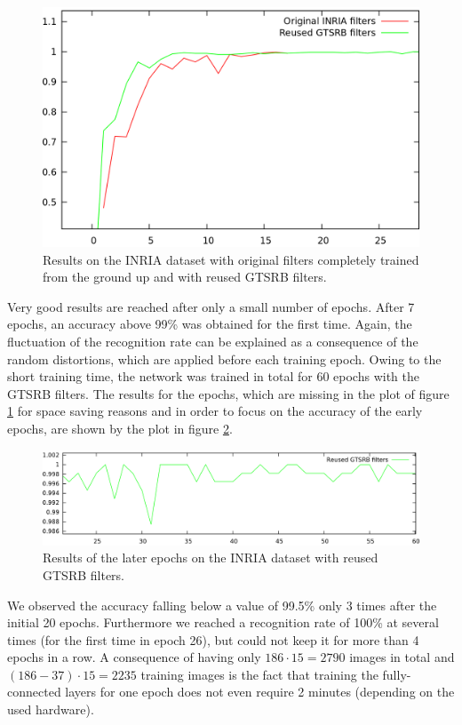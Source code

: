 \documentclass[11pt, a4paper]{article}
\begin{document}
\begin{figure}[h!]
	\centering
	\includegraphics[width=1\textwidth]{accuracy_plots/inria_results}
	\caption{Results on the INRIA dataset with original filters completely trained from the ground up and with reused GTSRB filters.}
	\label{fig:inria_results}
\end{figure}

Very good results are reached after only a small number of epochs. After 7 epochs, an accuracy above 99\% was obtained for the first time. Again, the fluctuation of the recognition rate can be explained as a consequence of the random distortions, which are applied before each training epoch. Owing to the short training time, the network was trained in total for 60 epochs with the GTSRB filters. The results for the epochs, which are missing in the plot of figure \ref{fig:inria_results} for space saving reasons and in order to focus on the accuracy of the early epochs, are shown by the plot in figure \ref{fig:inria_results_only_gtsrb}.
\begin{figure}[h!]
	\centering
	\includegraphics[width=1\textwidth]{accuracy_plots/inria_results_only_gtsrb}
	\caption{Results of the later epochs on the INRIA dataset with reused GTSRB filters.}
	\label{fig:inria_results_only_gtsrb}
\end{figure}
We observed the accuracy falling below a value of 99.5\% only 3 times after the initial 20 epochs. Furthermore we reached a recognition rate of 100\% at several times (for the first time in epoch 26), but could not keep it for more than 4 epochs in a row.
A consequence of having only $186 \cdot 15 = 2790$ images in total and $(186 - 37) \cdot 15 = 2235$ training images is the fact that training the fully-connected layers for one epoch does not even require 2 minutes (depending on the used hardware).
\end{document}
